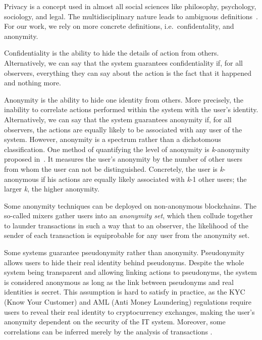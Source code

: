 Privacy is a concept used in almost all social sciences like philosophy, psychology, sociology, and legal. The multidisciplinary nature leads to ambiguous definitions~\cite{smithInformationPrivacyResearch2011}. For our work, we rely on more concrete definitions, i.e.~confidentality, and anonymity.

Confidentiality is the ability to hide the details of action from others. Alternatively, we can say that the system guarantees confidentiality if, for all observers, everything they can say about the action is the fact that it happened and nothing more.

Anonymity is the ability to hide one identity from others. More precisely, the inability to correlate actions performed within the system with the user's identity. Alternatively, we can say that the system guarantees anonymity if, for all observers, the actions are equally likely to be associated with any user of the system. However, anonymity is a spectrum rather than a dichotomous classification. One method of quantifying the level of anonymity is \textit{k}-anonymity proposed in~\cite{sweeneyKanonymityModelProtecting2002}. It measures the user's anonymity by the number of other users from whom the user can not be distinguished. Concretely, the user is \textit{k}-anonymous if his actions are equally likely associated with \textit{k}-1 other users; the larger \textit{k}, the higher anonymity.

Some anonymity techniques can be deployed on non-anonymous blockchains. The so-called mixers gather users into an \textit{anonymity set}, which then collude together to launder transactions in such a way that to an observer, the likelihood of the sender of each transaction is equiprobable for any user from the anonymity set.

Some systems guarantee pseudonymity rather than anonymity. Pseudonymity allows users to hide their real identity behind pseudonyms. Despite the whole system being transparent and allowing linking actions to pseudonyms, the system is considered anonymous as long as the link between pseudonyms and real identities is secret. This assumption is hard to satisfy in practice, as the KYC (Know Your Customer) and AML (Anti Money Laundering) regulations require users to reveal their real identity to cryptocurrency exchanges, making the user's anonymity dependent on the security of the IT system. Moreover, some correlations can be inferred merely by the analysis of transactions \cite{androulakiEvaluatingUserPrivacy2013, oberStructureAnonymityBitcoin2013}.


